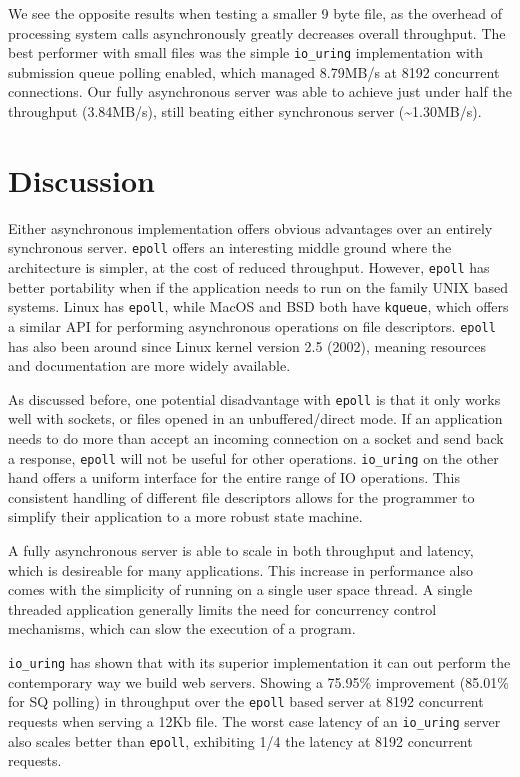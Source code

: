 \documentclass[letterpaper, 10pt, twocolumn]{article}
\begin{document}
We see the opposite results when testing a smaller 9 byte file, as the overhead of processing system calls asynchronously greatly decreases overall throughput. The best performer with small files was the simple \texttt{io\_uring} implementation with submission queue polling enabled, which managed 8.79MB/s at 8192 concurrent connections. Our fully asynchronous server was able to achieve just under half the throughput (3.84MB/s), still beating either synchronous server (\textasciitilde{}1.30MB/s).

\section{Discussion}
\label{sec:orgfc4a1c0}
Either asynchronous implementation offers obvious advantages over an entirely synchronous server. \texttt{epoll} offers an interesting middle ground where the architecture is simpler, at the cost of reduced throughput. However, \texttt{epoll} has better portability when if the application needs to run on the family UNIX based systems. Linux has \texttt{epoll}, while MacOS and BSD both have \texttt{kqueue}, which offers a similar API for performing asynchronous operations on file descriptors. \texttt{epoll} has also been around since Linux kernel version 2.5 (2002), meaning resources and documentation are more widely available.

As discussed before, one potential disadvantage with \texttt{epoll} is that it only works well with sockets, or files opened in an unbuffered/direct mode. If an application needs to do more than accept an incoming connection on a socket and send back a response, \texttt{epoll} will not be useful for other operations. \texttt{io\_uring} on the other hand offers a uniform interface for the entire range of IO operations. This consistent handling of different file descriptors allows for the programmer to simplify their application to a more robust state machine.

A fully asynchronous server is able to scale in both throughput and latency, which is desireable for many applications. This increase in performance also comes with the simplicity of running on a single user space thread. A single threaded application generally limits the need for concurrency control mechanisms, which can slow the execution of a program.

\texttt{io\_uring} has shown that with its superior implementation it can out perform the contemporary way we build web servers. Showing a 75.95\% improvement (85.01\% for SQ polling) in throughput over the \texttt{epoll} based server at 8192 concurrent requests when serving a 12Kb file. The worst case latency of an \texttt{io\_uring} server also scales better than \texttt{epoll}, exhibiting 1/4 the latency at 8192 concurrent requests.
\end{document}
